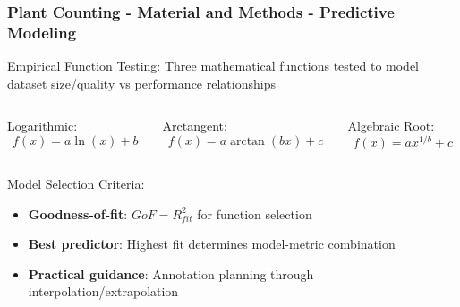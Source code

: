 \documentclass[aspectratio=43]{beamer}
\begin{document}
\begin{frame}
    \frametitle{\small Plant Counting - Material and Methods - Predictive Modeling}
    
    \begin{block}{Empirical Function Testing:}
        \small Three mathematical functions tested to model dataset size/quality vs performance relationships
    \end{block}
    
    \begin{columns}
        \begin{column}{0.33\textwidth}
            \begin{exampleblock}{Logarithmic:}
                \scriptsize
                $$f(x) = a \ln(x) + b$$
            \end{exampleblock}
        \end{column}
        
        \begin{column}{0.33\textwidth}
            \begin{alertblock}{Arctangent:}
                \scriptsize
                $$f(x) = a \arctan(bx) + c$$
            \end{alertblock}
        \end{column}
        
        \begin{column}{0.33\textwidth}
            \begin{block}{Algebraic Root:}
                \scriptsize
                $$f(x) = a x^{1/b} + c$$
            \end{block}
        \end{column}
    \end{columns}
    
    \begin{exampleblock}{Model Selection Criteria:}
        \small
        \begin{itemize}
            \item \textbf{Goodness-of-fit}: $GoF = R^2_{fit}$ for function selection
            \item \textbf{Best predictor}: Highest fit determines model-metric combination
            \item \textbf{Practical guidance}: Annotation planning through interpolation/extrapolation
        \end{itemize}
    \end{exampleblock}
\end{frame}
\end{document}
